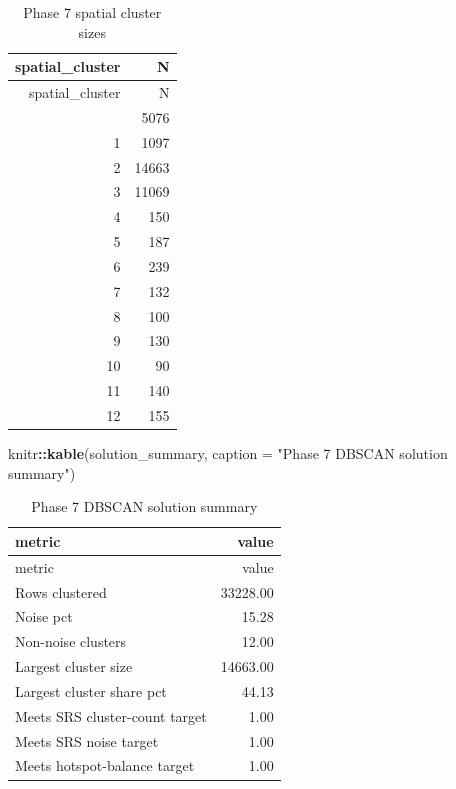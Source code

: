 \documentclass[
]{article}
\newenvironment{Shaded}{\begin{snugshade}}{\end{snugshade}}
\newcommand{\AttributeTok}[1]{\textcolor[rgb]{0.13,0.29,0.53}{#1}}
\newcommand{\FunctionTok}[1]{\textcolor[rgb]{0.13,0.29,0.53}{\textbf{#1}}}
\newcommand{\NormalTok}[1]{#1}
\newcommand{\SpecialCharTok}[1]{\textcolor[rgb]{0.81,0.36,0.00}{\textbf{#1}}}
\newcommand{\StringTok}[1]{\textcolor[rgb]{0.31,0.60,0.02}{#1}}
\begin{document}
\begin{longtable}[]{@{}rr@{}}
\caption{Phase 7 spatial cluster sizes}\tabularnewline
\toprule\noalign{}
spatial\_cluster & N \\
\midrule\noalign{}
\endfirsthead
\toprule\noalign{}
spatial\_cluster & N \\
\midrule\noalign{}
\endhead
\bottomrule\noalign{}
\endlastfoot
0 & 5076 \\
1 & 1097 \\
2 & 14663 \\
3 & 11069 \\
4 & 150 \\
5 & 187 \\
6 & 239 \\
7 & 132 \\
8 & 100 \\
9 & 130 \\
10 & 90 \\
11 & 140 \\
12 & 155 \\
\end{longtable}

\begin{Shaded}
\begin{Highlighting}[]
\NormalTok{knitr}\SpecialCharTok{::}\FunctionTok{kable}\NormalTok{(solution\_summary, }\AttributeTok{caption =} \StringTok{"Phase 7 DBSCAN solution summary"}\NormalTok{)}
\end{Highlighting}
\end{Shaded}

\begin{longtable}[]{@{}lr@{}}
\caption{Phase 7 DBSCAN solution summary}\tabularnewline
\toprule\noalign{}
metric & value \\
\midrule\noalign{}
\endfirsthead
\toprule\noalign{}
metric & value \\
\midrule\noalign{}
\endhead
\bottomrule\noalign{}
\endlastfoot
Rows clustered & 33228.00 \\
Noise pct & 15.28 \\
Non-noise clusters & 12.00 \\
Largest cluster size & 14663.00 \\
Largest cluster share pct & 44.13 \\
Meets SRS cluster-count target & 1.00 \\
Meets SRS noise target & 1.00 \\
Meets hotspot-balance target & 1.00 \\
\end{longtable}
\end{document}
